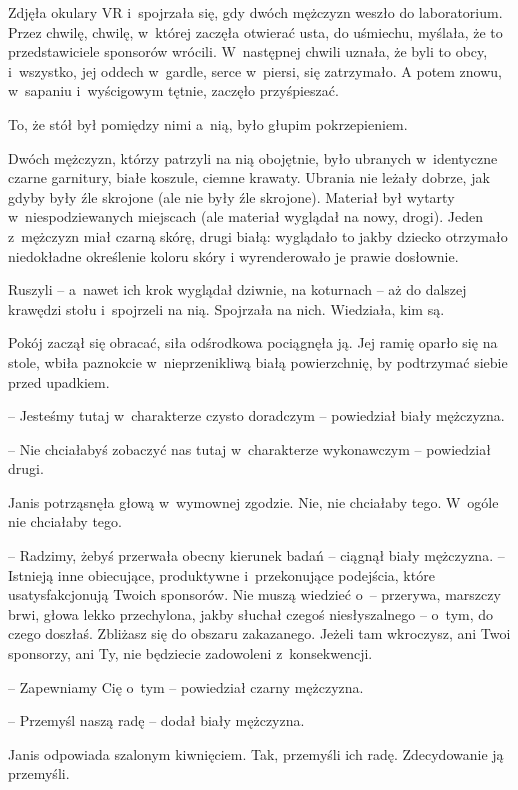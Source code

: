 \documentclass[oneside,polish,11pt,sfheadings]{mwbk}
\begin{document}
Zdjęła okulary VR i~spojrzała się, gdy dwóch mężczyzn weszło do
laboratorium. Przez chwilę, chwilę, w~której zaczęła otwierać usta, do
uśmiechu, myślała, że to przedstawiciele sponsorów wrócili. W~następnej
chwili uznała, że byli to obcy, i~wszyst\-ko, jej oddech w~gardle, serce w~piersi, się zatrzymało. A potem znowu, w~sapaniu i~wyścigowym tętnie,
zaczęło przyśpieszać.

To, że stół był pomiędzy nimi a~nią, było głupim pokrzepieniem.

Dwóch mężczyzn, którzy patrzyli na nią obojętnie, było ubranych w~identyczne czarne garnitury, białe koszule, ciemne krawaty. Ubrania nie
leżały dobrze, jak gdyby były źle skrojone (ale nie były źle skrojone).
Materiał był wytarty w~niespodziewanych miejscach (ale materiał wyglądał
na nowy, drogi). Jeden z~mężczyzn miał czarną skórę, drugi białą:
wyglądało to jakby dziecko otrzymało niedokładne określenie koloru skóry
i wyrenderowało je prawie dosłownie.

Ruszyli -- a~nawet ich krok wyglądał dziwnie, na koturnach -- aż do
dalszej krawędzi stołu i~spojrzeli na nią. Spojrzała na nich. Wiedziała,
kim są.

Pokój zaczął się obracać, siła odśrodkowa pociągnęła ją. Jej ramię
oparło się na stole, wbiła paznokcie w~nieprzenikliwą białą
powierzchnię, by podtrzymać siebie przed upadkiem.

-- Jesteśmy tutaj w~charakterze czysto doradczym -- powiedział biały
mężczyzna.

-- Nie chciałabyś zobaczyć nas tutaj w~charakterze wykonawczym -- powiedział drugi.

Janis potrząsnęła głową w~wymownej zgodzie. Nie, nie chciałaby tego. W~ogóle nie chciałaby tego.

-- Radzimy, żebyś przerwała obecny kierunek badań -- ciągnął biały
mężczyzna. -- Istnieją inne obiecujące, produktywne i~przekonujące
podejścia, które usatysfakcjonują Twoich sponsorów. Nie muszą wiedzieć o~-- przerywa, marszczy brwi, głowa lekko przechylona, jakby słuchał czegoś
niesłyszalnego -- o~tym, do czego doszłaś. Zbliżasz się do obszaru
zakazanego. Jeżeli tam wkroczysz, ani Twoi sponsorzy, ani Ty, nie
będziecie zadowoleni z~konsekwencji.

-- Zapewniamy Cię o~tym -- powiedział czarny mężczyzna.

-- Przemyśl naszą radę -- dodał biały mężczyzna.

Janis odpowiada szalonym kiwnięciem. Tak, przemyśli ich radę.
Zdecydowanie ją przemyśli.
\end{document}
